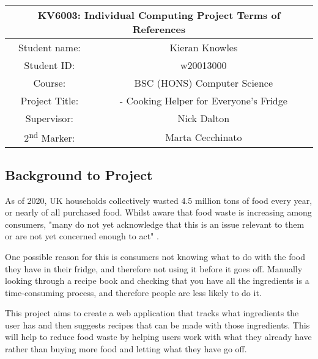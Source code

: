\documentclass[../CHEFCookingHelperForEveryonesFridge.tex]{subfiles}
\renewcommand{\cite}[1]{\parencite{#1}}
\begin{document}
\begin{table}[h!]
    \centering
    \begin{tabular}{|c|c|}
        \hline
        \multicolumn{2}{|c|}{KV6003: Individual Computing Project Terms of References} \\\hline
        Student name: & Kieran Knowles \\\hline
        Student ID: & w20013000 \\\hline
        Course: & BSC (HONS) Computer Science \\\hline
        Project Title: & \chef{} - Cooking Helper for Everyone's Fridge \\\hline
        Supervisor: & Nick Dalton \\\hline
        2\textsuperscript{nd} Marker: & Marta Cecchinato \\\hline
    \end{tabular}
\end{table}

\subsection{Background to Project}
As of 2020, UK households collectively wasted 4.5 million tons of food every year, or nearly  of all purchased food.
Whilst aware that food waste is increasing among consumers, "many do not yet acknowledge that this is an issue relevant to them or are not
yet concerned enough to act" \cite{wrap_uk_2020}.

One possible reason for this is consumers not knowing what to do with the food they have in their fridge, and therefore not using it before it goes off.
Manually looking through a recipe book and checking that you have all the ingredients is a time-consuming process, and therefore people are less likely to do it.

This project aims to create a web application that tracks what ingredients the user has and then suggests recipes that can be made with those ingredients.
This will help to reduce food waste by helping users work with what they already have rather than buying more food and letting what they have go off.
\end{document}
